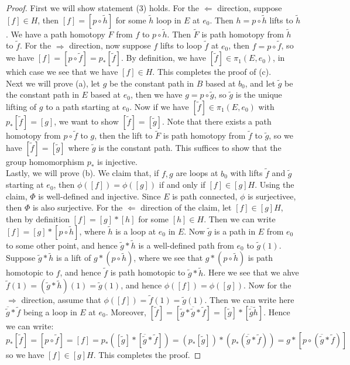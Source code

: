 \documentclass[11pt]{book}
\theoremstyle{break}
\theoremstyle{break}
\newcommand{\that}[1]{\widetilde{#1}}
\begin{document}
\begin{proof}
First we will show statement (3) holds. For the $\Leftarrow$ direction, suppose $[f] \in H$, then $[f] = [p \circ \that{h}]$ for some $\that{h}$ loop in $E$ at $e_0$. Then $h = p\circ \that{h}$ lifts to $\that{h}$. We have a path homotopy $F$ from $f$ to $p\circ \that{h}$. Then $\that{F}$ is path homotopy from $\that{h}$ to $\that{f}$. For the $\Rightarrow$ direction, now suppose $f$ lifts to loop $\that{f}$ at $e_0$, then $f = p\circ \that{f}$, so we have $[f] = [p \circ \that{f}] = p_*[\that{f}]$. By definition, we have $[\that{f}] \in \pi_{1}(E,e_0)$, in which case we see that we have $[f] \in H$. This completes the proof of (c).\\

Next we will prove (a), let $g$ be the constant path in $B$ based at $b_0$, and let $\that{g}$ be the constant path in $E$ based at $e_0$, then we have $g = p\circ \that{g}$, so $\that{g}$ is the unique lifting of $g$ to a path starting at $e_0$. Now if we have $[\that{f}] \in \pi_1(E,e_0)$ with $p_*[\that{f} ] = [g]$, we want to show $[\that{f} ] = [\that{g}]$. Note that there exists a path homotopy from $p\circ \that{f}$ to $g$, then the lift to $\that{F}$ is path homotopy from $\that{f}$ to $\that{g}$, so we have $[\that{f}] = [\that{g}]$ where $\that{g}$ is the constant path. This suffices to show that the group homomorphism $p_*$ is injective. \\

Lastly, we will prove (b). We claim that, if $f,g$ are loops at $b_0$ with lifts $\that{f}$ and $\that{g}$ starting at $e_0$, then $\phi([f]) = \phi([g])$ if and only if $[f] \in [g] H$. Using the claim, $\Phi$ is well-defined and injective. Since $E$ is path connected, $\phi$ is surjectivee, then $\Phi$ is also surjective. For the $\Leftarrow$ direction of  the claim, let $[f] \in [g]H$, then by definition $[f] = [g]* [h]$ for some $[h] \in H$. Then we can write $[f] = [g]* [p \circ \that{h}]$, where $\that{h}$ is a loop at $e_0 $ in $E$. Now $\that{g}$ is a path in $E$ from $e_0$ to some other point, and hence $\that{g}*\that{h}$ is a well-defined path from $e_0$ to $\that{g}(1)$. Suppose $\that{g}* \that{h}$ is a lift of $g*(p\circ \that{h})$, where we see that $g*(p\circ \that{h})$ is path homotopic to $f$, and hence $\that{f}$ is path homotopic to $\that{g}* \that{h}$. Here we see that we ahve $\that{f}(1) = (\that{g}* \that{h})(1) = \that{g}(1) $, and hence $\phi([f]) = \phi([g])$. Now for the $\Rightarrow$ direction, assume that $\phi([f]) = \that{f}(1) = \that{g}(1)$. Then we can write here $\overline{\that{g}}*\that{f}$ being a loop in $E$ at $e_0$. Moreover, $[\that{f} ] = [\that{g}* \overline{\that{g}}* \that{f} ] = [\that{g}]* [\overline{\that{g}}\that{h}]$. Hence we can write:
$$p_*[\that{f}] = [p\circ \that{f}] = [f] = p_*([\that{g}]*[\overline{\that{g}}*\that{f}]) = (p_*[\that{g}])*(p_* (\overline{\that{g}}* \that{f})) = g*[p \circ (\overline{\that{g}}*\that{f})]$$ 
so we have $[f]\in [g]H$. This completes the proof.
\end{proof}
\end{document}
